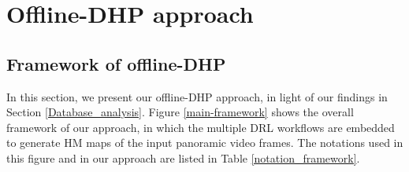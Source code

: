 \documentclass[10pt,journal,compsoc]{IEEEtran}
\begin{document}



\section{Offline-DHP approach}\label{sec::offline-DHP}

\subsection{Framework of offline-DHP}
\label{framework}

In this section, we present our offline-DHP approach, in light of our findings in Section \ref{Database_analysis}.
Figure \ref{main-framework} shows the overall framework of our approach, in which the multiple DRL workflows are embedded to generate HM maps of the input panoramic video frames. The notations used in this figure and in our approach are listed in Table \ref{notation_framework}.





\end{document}
